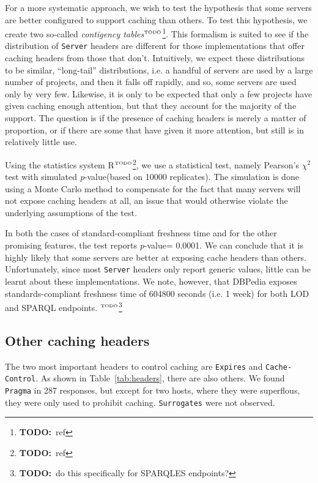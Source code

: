 \documentclass{article}
\newcommand{\pvalue}{\textit{p}-value}
\newcommand{\httph}[1]{\texttt{#1}}
\newcommand{\todo}[1]{\ensuremath{^{\textrm{\tiny{TODO}\normalsize}}}\footnote{\textbf{TODO:}~#1}}
\begin{document}
For a more systematic approach, we wish to test the hypothesis that
some servers are better configured to support caching than others. To
test this hypothesis, we create two so-called \emph{contigency
  tables}\todo{ref}. This formalism is suited to see if the
distribution of  \httph{Server} headers are different for those implementations that
offer caching headers from those that don't. Intuitively, we expect
these distributions to be similar, ``long-tail'' distributions, i.e. a
handful of servers are used by a large number of projects, and then it
falls off rapidly, and so, some servers are used only by very
few. Likewise, it is only to be expected that only a few projects have
given caching enough attention, but that they account for the majority
of the support. The question is if the presence of caching headers is
merely a matter of proportion, or if there are some that have given it
more attention, but still is in relatively little use.

Using the statistics system R\todo{ref}, we use a statistical test,
namely Pearson's $\chi^2$ test with simulated \pvalue (based on 10000
replicates). The simulation is done using a Monte Carlo method to
compensate for the fact that many servers will not expose caching
headers at all, an issue that would otherwise violate the underlying
assumptions of the test.

In both the cases of standard-compliant freshness time and for the
other promising features, the test reports \pvalue = 0.0001. We can
conclude that it is highly likely that some servers are better at
exposing cache headers than others. Unfortunately, since most
\httph{Server} headers only report generic values, little can be
learnt about these implementations. We note, however, that DBPedia
exposes standards-compliant freshness time of 604800 seconds (i.e. 1
week) for both LOD and SPARQL endpoints. \todo{do this specifically
  for SPARQLES endpoints?}

\subsection{Other caching headers}

The two most important headers to control caching are \httph{Expires}
and \httph{Cache-Control}. As shown in Table~\ref{tab:headers}, there
are also others. We found \httph{Pragma} in 287 responses, but except
for two hosts, where they were superflous, they were only used to
prohibit caching. \httph{Surrogates} were not observed.
\end{document}
